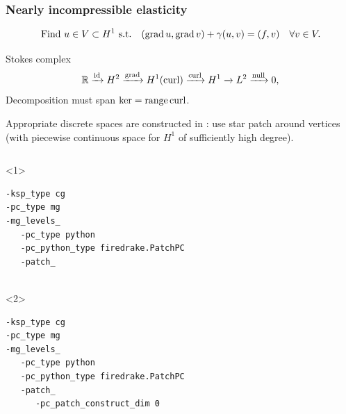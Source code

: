 \documentclass[presentation,aspectratio=43,10pt]{beamer}
\DeclareMathOperator{\grad}{grad}
\let\div\relax
\DeclareMathOperator{\div}{div}
\DeclareMathOperator{\curl}{curl}
\DeclareMathOperator{\range}{range}
\begin{document}
\begin{frame}[fragile]
  \frametitle{Nearly incompressible elasticity}
  \vspace*{-1.5\baselineskip}
  \begin{equation*}
    \text{Find $u \in V \subset H^1$ s.t.} \quad (\grad u, \grad v) + \gamma (\div u, \div v) = (f, v) \quad \forall v \in V.
  \end{equation*}
  \vspace*{-\baselineskip}
  \begin{block}{Stokes complex}
    \begin{equation*}
      \mathbb{R} \xrightarrow{\operatorname{id}} H^2 \xrightarrow{\grad} H^1(\curl)
      \xrightarrow{\curl} H^1 \xrightarrow{\div} L^2 \xrightarrow{\operatorname{null}} 0,
    \end{equation*}
    Decomposition must span $\ker \div = \range \curl$.

    Appropriate discrete spaces are constructed in \textcite{Neilan:2015a}: use
    star patch around vertices (with piecewise continuous space for
    $H^1$ of sufficiently high degree).
  \end{block}
  \begin{columns}
    \begin{column}{0.6\textwidth}
      \begin{onlyenv}<1>
\begin{verbatim}
-ksp_type cg
-pc_type mg
-mg_levels_
   -pc_type python
   -pc_python_type firedrake.PatchPC
   -patch_


\end{verbatim}
      \end{onlyenv}
      \begin{onlyenv}<2>
\begin{verbatim}
-ksp_type cg
-pc_type mg
-mg_levels_
   -pc_type python
   -pc_python_type firedrake.PatchPC
   -patch_
      -pc_patch_construct_dim 0


\end{verbatim}
\end{onlyenv}
\end{column}
\end{columns}
\end{frame}
\end{document}
